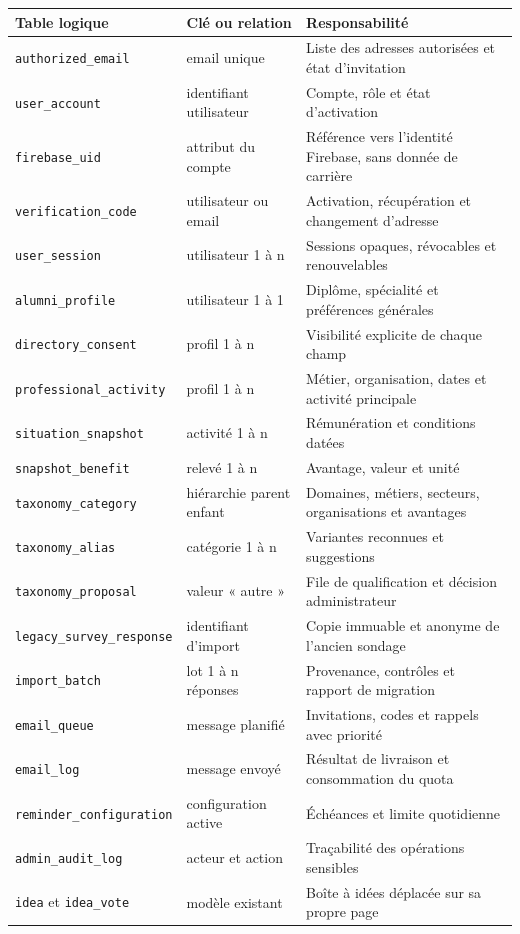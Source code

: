 \documentclass[11pt,a4paper]{article}
\begin{document}
\begin{longtable}{@{}L{48mm}L{45mm}L{69mm}@{}}
  \toprule
  \textbf{Table logique} & \textbf{Clé ou relation} & \textbf{Responsabilité} \\
  \midrule
  \endhead
  \texttt{authorized\_email} & email unique & Liste des adresses autorisées et état d'invitation \\
  \texttt{user\_account} & identifiant utilisateur & Compte, rôle et état d'activation \\
  \texttt{firebase\_uid} & attribut du compte & Référence vers l'identité Firebase, sans donnée de carrière \\
  \texttt{verification\_code} & utilisateur ou email & Activation, récupération et changement d'adresse \\
  \texttt{user\_session} & utilisateur 1 à n & Sessions opaques, révocables et renouvelables \\
  \texttt{alumni\_profile} & utilisateur 1 à 1 & Diplôme, spécialité et préférences générales \\
  \texttt{directory\_consent} & profil 1 à n & Visibilité explicite de chaque champ \\
  \texttt{professional\_activity} & profil 1 à n & Métier, organisation, dates et activité principale \\
  \texttt{situation\_snapshot} & activité 1 à n & Rémunération et conditions datées \\
  \texttt{snapshot\_benefit} & relevé 1 à n & Avantage, valeur et unité \\
  \texttt{taxonomy\_category} & hiérarchie parent enfant & Domaines, métiers, secteurs, organisations et avantages \\
  \texttt{taxonomy\_alias} & catégorie 1 à n & Variantes reconnues et suggestions \\
  \texttt{taxonomy\_proposal} & valeur « autre » & File de qualification et décision administrateur \\
  \texttt{legacy\_survey\_response} & identifiant d'import & Copie immuable et anonyme de l'ancien sondage \\
  \texttt{import\_batch} & lot 1 à n réponses & Provenance, contrôles et rapport de migration \\
  \texttt{email\_queue} & message planifié & Invitations, codes et rappels avec priorité \\
  \texttt{email\_log} & message envoyé & Résultat de livraison et consommation du quota \\
  \texttt{reminder\_configuration} & configuration active & Échéances et limite quotidienne \\
  \texttt{admin\_audit\_log} & acteur et action & Traçabilité des opérations sensibles \\
  \texttt{idea} et \texttt{idea\_vote} & modèle existant & Boîte à idées déplacée sur sa propre page \\
  \bottomrule
\end{longtable}
\end{document}
